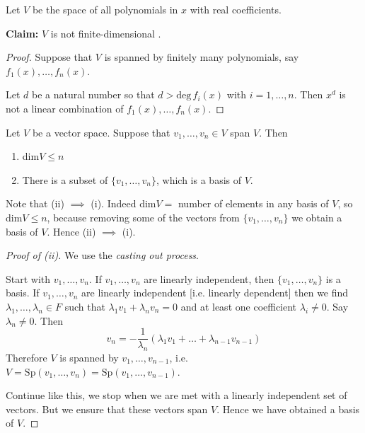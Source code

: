 \documentclass[10pt]{scrartcl}
\begin{document}
\begin{example}
Let $V$ be the space of all polynomials in $x$ with real coefficients. 

\textbf{Claim:} $V$ is not finite-dimensional . 
\begin{proof}
Suppose that $V$ is spanned by finitely many polynomials, say $f_1(x),\dots,f_n(x)$. 

Let $d$ be a natural number so that $d > \mathrm{deg}\,f_i(x)$ with $i = 1,\dots,n$. Then $x^d$ is not a linear combination of $f_1(x),\dots,f_n(x)$. 
\end{proof}
\end{example}

\pagebreak

\begin{theorem}
Let $V$ be a vector space. Suppose that $v_1,\dots,v_n\in V$ span $V$. Then 
\begin{enumerate}
\item  dim$V\leq n$
\item There is a subset of $\{v_1,\dots,v_n\}$, which is a basis of $V$. 	
\end{enumerate}
\end{theorem}

Note that (ii) $\implies$ (i). Indeed dim$V = $ number of elements in any basis of $V$, so dim$V \leq n$, because removing some of the vectors from $\{v_1,\dots,v_n\}$ we obtain a basis of $V$. Hence (ii) $\implies$ (i). 

\begin{proof}[Proof of (ii)]
We use the \emph{casting out process}. 

Start with $v_1,\dots,v_n$. If $v_1,\dots,v_n$ are linearly independent, then $\{v_1,\dots,v_n\}$ is a basis. If $v_1,\dots,v_n$ are linearly independent [i.e. linearly dependent] then we find $\lambda_1,\dots,\lambda_n \in F$ such that $\lambda_1v_1 + \lambda_nv_n = 0$ and at least one coefficient $\lambda_i \neq 0$. Say $\lambda_n \neq 0$. Then 
\[
  v_n = -\frac{1}{\lambda_n}(\lambda_1v_1 + \dots + \lambda_{n-1}v_{n-1})
\]
Therefore $V$ is spanned by $v_1,\dots,v_{n-1}$, i.e. $V = \mathrm{Sp}(v_1,\dots,v_n) = \mathrm{Sp}(v_1,\dots,v_{n-1})$. 

Continue like this, we stop when we are met with a linearly independent set of vectors. But we ensure that these vectors span $V$. Hence we have obtained a basis of $V$.
\end{proof}
\end{document}
